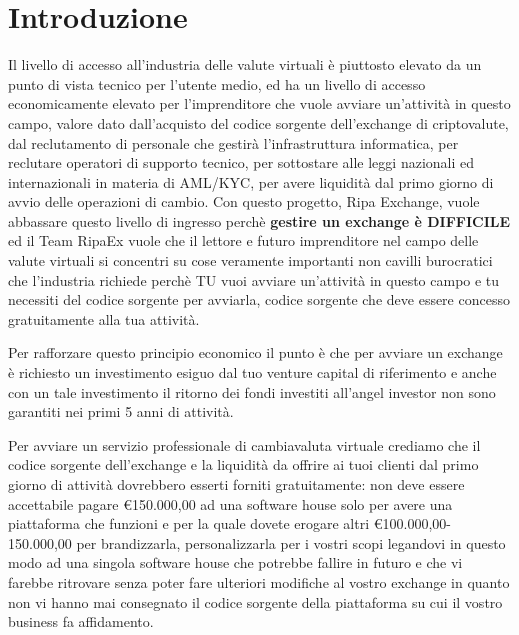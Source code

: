 \documentclass[11pt,fleqn]{book} %
\begin{document}


\chapter{Introduzione}
Il livello di accesso all'industria delle valute virtuali è piuttosto elevato da un punto di vista tecnico per l'utente medio, 
ed ha un livello di accesso economicamente elevato per l'imprenditore che vuole avviare un'attività in questo campo, valore dato 
dall'acquisto del codice sorgente dell'exchange di criptovalute, dal reclutamento di personale che gestirà l'infrastruttura informatica,
per reclutare operatori di supporto tecnico, per sottostare alle leggi nazionali ed internazionali in materia di AML/KYC, per avere liquidità
dal primo giorno di avvio delle operazioni di cambio. Con questo progetto, Ripa Exchange, vuole abbassare questo livello di ingresso 
perchè \textbf{gestire un exchange è DIFFICILE} ed il Team RipaEx vuole che il lettore e futuro imprenditore nel campo delle valute
virtuali si concentri su cose veramente importanti non cavilli burocratici che l'industria richiede perchè TU vuoi avviare un'attività
in questo campo e tu necessiti del codice sorgente per avviarla, codice sorgente che deve essere concesso gratuitamente alla tua attività.

Per rafforzare questo principio economico il punto è che per avviare un exchange è richiesto un investimento esiguo dal tuo 
venture capital di riferimento e anche con un tale investimento il ritorno dei fondi investiti all'angel investor non sono garantiti
nei primi 5 anni di attività.

Per avviare un servizio professionale di cambiavaluta virtuale crediamo che il codice sorgente dell'exchange e la liquidità da offrire ai tuoi clienti
dal primo giorno di attività dovrebbero esserti forniti gratuitamente: non deve essere accettabile pagare \euro150.000,00 ad una software house
solo per avere una piattaforma che funzioni e per la quale dovete erogare altri \euro100.000,00-150.000,00 per brandizzarla, personalizzarla
per i vostri scopi legandovi in questo modo ad una singola software house che potrebbe fallire in futuro e che vi farebbe ritrovare
senza poter fare ulteriori modifiche al vostro exchange in quanto non vi hanno mai consegnato il codice sorgente della piattaforma
su cui il vostro business fa affidamento.
\end{document}
